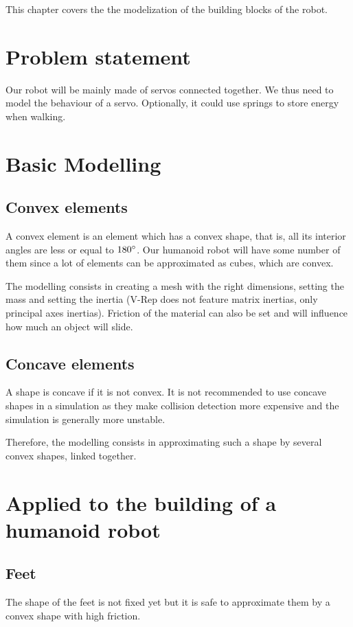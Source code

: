 This chapter covers the the modelization of the building blocks of the robot.

\section{Problem statement}
Our robot will be mainly made of servos connected together. We thus need to model the behaviour of a servo. Optionally, it could use springs to store energy when walking. 

\section{Basic Modelling}
\subsection{Convex elements}
A convex element is an element which has a convex shape, that is, all its interior angles are less or equal to $180\degree$. Our humanoid robot will have some number of them since a lot of elements can be approximated as cubes, which are convex.

The modelling consists in creating a mesh with the right dimensions, setting the mass and setting the inertia (V-Rep does not feature matrix inertias, only principal axes inertias). Friction of the material can also be set and will influence how much an object will slide.

\subsection{Concave elements}
A shape is concave if it is not convex. It is not recommended to use concave shapes in a simulation as they make collision detection more expensive and the simulation is generally more unstable. 

Therefore, the modelling consists in approximating such a shape by several convex shapes, linked together.

\section{Applied to the building of a humanoid robot}
\subsection{Feet}
The shape of the feet is not fixed yet but it is safe to approximate them by a convex shape with high friction. 

